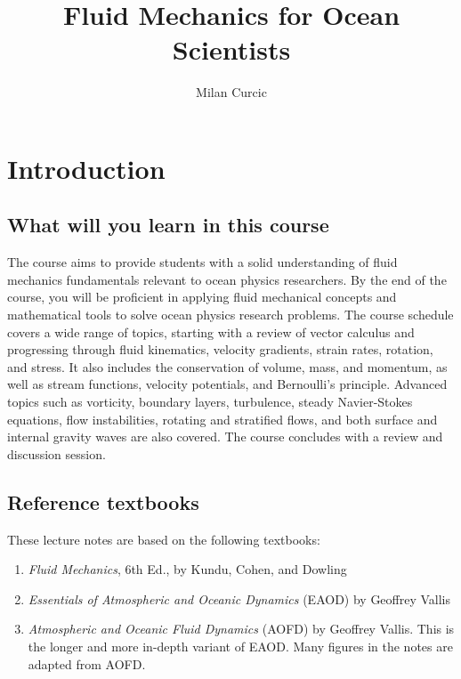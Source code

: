 \documentclass[12pt]{article}
\numberwithin{equation}{section}
\numberwithin{figure}{section}
\numberwithin{table}{section}
\begin{document}
\title{Fluid Mechanics for Ocean Scientists}
\author{Milan Curcic}
\date{}

\maketitle

\tableofcontents

\newpage
\section{Introduction}

\subsection{What will you learn in this course}

The course aims to provide students with a solid understanding of fluid
mechanics fundamentals relevant to ocean physics researchers.
By the end of the course, you will be proficient in applying fluid mechanical
concepts and mathematical tools to solve ocean physics research problems.
The course schedule covers a wide range of topics, starting with a review of
vector calculus and progressing through fluid kinematics, velocity gradients,
strain rates, rotation, and stress. It also includes the conservation of
volume, mass, and momentum, as well as stream functions, velocity potentials,
and Bernoulli's principle. Advanced topics such as vorticity, boundary layers,
turbulence, steady Navier-Stokes equations, flow instabilities, rotating and
stratified flows, and both surface and internal gravity waves are also covered.
The course concludes with a review and discussion session.

\subsection{Reference textbooks}

These lecture notes are based on the following textbooks:

\begin{enumerate}
  \item \textit{Fluid Mechanics}, 6th Ed., by Kundu, Cohen, and Dowling
  \item \textit{Essentials of Atmospheric and Oceanic Dynamics} (EAOD) by Geoffrey Vallis
  \item \textit{Atmospheric and Oceanic Fluid Dynamics} (AOFD) by Geoffrey Vallis.
  This is the longer and more in-depth variant of EAOD.
  Many figures in the notes are adapted from AOFD.
\end{enumerate}
\end{document}
